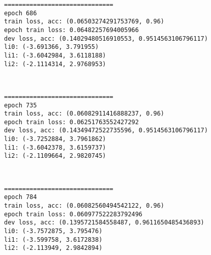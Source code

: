 \documentclass[11pt]{article}
\begin{document}
    \begin{Verbatim}[commandchars=\\\{\}]
==============================
epoch 686
train loss, acc: (0.06503274291753769, 0.96)
epoch train loss: 0.06482257694005966
dev loss, acc: (0.14029480516910553, 0.9514563106796117)
li0: (-3.691366, 3.791955)
li1: (-3.6042984, 3.6118188)
li2: (-2.1114314, 2.9768953)

    \end{Verbatim}

    \begin{center}
    \end{center}
    { \hspace*{\fill} \\}
    
    \begin{Verbatim}[commandchars=\\\{\}]
==============================
epoch 735
train loss, acc: (0.06082911416888237, 0.96)
epoch train loss: 0.06251763552427292
dev loss, acc: (0.14349472522735596, 0.9514563106796117)
li0: (-3.7252884, 3.7961862)
li1: (-3.6042378, 3.6159737)
li2: (-2.1109664, 2.9820745)

    \end{Verbatim}

    \begin{center}
    \end{center}
    { \hspace*{\fill} \\}
    
    \begin{Verbatim}[commandchars=\\\{\}]
==============================
epoch 784
train loss, acc: (0.06082560494542122, 0.96)
epoch train loss: 0.060977522283792496
dev loss, acc: (0.1395721584558487, 0.9611650485436893)
li0: (-3.7572875, 3.795476)
li1: (-3.599758, 3.6172838)
li2: (-2.113949, 2.9842894)

    \end{Verbatim}

    \begin{center}
    \end{center}
    { \hspace*{\fill} \\}
    
\end{document}
